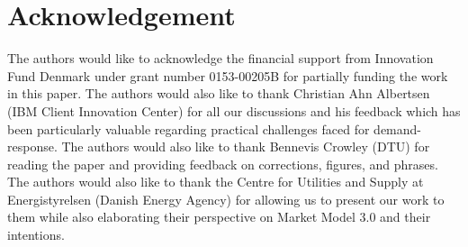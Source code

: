 \section*{Acknowledgement}

The authors would like to acknowledge the financial support from Innovation Fund Denmark under grant number 0153-00205B for partially funding the work in this paper. The authors would also like to thank Christian Ahn Albertsen (IBM Client Innovation Center) for all our discussions and his feedback which has been particularly valuable regarding practical challenges faced for demand-response. The authors would also like to thank Bennevis Crowley (DTU) for reading the paper and providing feedback on corrections, figures, and phrases. The authors would also like to thank the Centre for Utilities and Supply at Energistyrelsen (Danish Energy Agency) for allowing us to present our work to them while also elaborating their perspective on Market Model 3.0 and their intentions.
